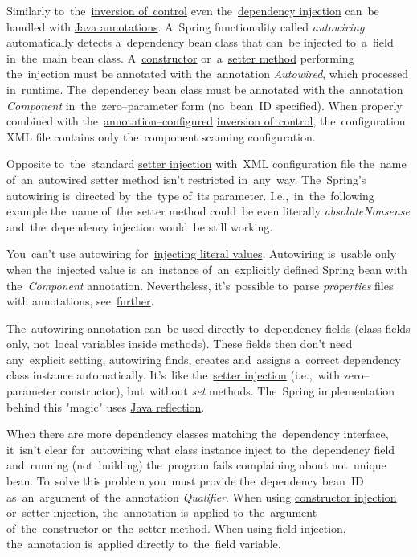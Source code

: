 \label{autowiring}
Similarly to~the~\hyperref[springinversionofcontrol]{inversion of~control} even the~\hyperref[springdependencyinjection]{dependency injection} can~be handled with \hyperref[javaannotation]{Java annotations}.
A~Spring functionality called \textit{autowiring} automatically detects a~dependency bean class that can~be injected to~a~field in~the~main bean class.
A~\hyperref[constructorinjection]{constructor} or~a~\hyperref[setterinjection]{setter method} performing the~injection must be annotated with the~annotation \textit{Autowired}, which processed in~runtime.
The~dependency bean class must be annotated with the~annotation \textit{Component} in~the~zero--parameter form (no~bean~ID specified).
When properly combined with the~\hyperref[iocannotations]{annotation--configured} \hyperref[springinversionofcontrol]{inversion of~control}, the~configuration XML file contains only the~component scanning configuration.

\note Opposite to~the~standard \hyperref[setterinjection]{setter injection} with~XML configuration file the~name of~an~autowired setter method isn't restricted in~any~way.
The~Spring's autowiring is~directed by~the~type of~its parameter.
I.e.,~in~the~following example the~name of~the~setter method could~be even literally \textit{absoluteNonsense} and~the~dependency injection would~be still working.

\warning You~can't use autowiring for~\hyperref[injectingliteralvalues]{injecting literal values}.
Autowiring is~usable only when the~injected value is~an~instance of~an~explicitly defined Spring bean with the~\textit{Component} annotation.
Nevertheless, it's~possible to~parse \textit{properties} files with annotations, see~\hyperref[readingpropertiesannotations]{further}.

\label{fieldinjection}
The~\hyperref[autowiring]{autowiring} annotation can~be used directly to~dependency \hyperref[variablefieldproperty]{fields} (class fields only, not~local variables inside methods).
These fields then don't need any~explicit setting, autowiring finds, creates and~assigns a~correct dependency class instance automatically.
It's~like the~\hyperref[setterinjection]{setter injection} (i.e.,~with zero--parameter constructor), but~without \textit{set} methods.
The~Spring implementation behind this "magic" uses \hyperref[reflection]{Java reflection}.

When there are more dependency classes matching the~dependency interface, it~isn't clear for~autowiring what class instance inject to~the~dependency field and~running (not~building) the~program fails complaining about not~unique bean.
To~solve this problem you~must provide the~dependency bean~ID as~an~argument of~the~annotation \textit{Qualifier}.
When using \hyperref[constructorinjectionautowire]{constructor injection} or~\hyperref[setterinjectionautowire]{setter injection}, the~annotation is~applied to~the~argument of~the~constructor or~the~setter method.
When using field injection, the~annotation is~applied directly to~the~field variable.
\newpage

